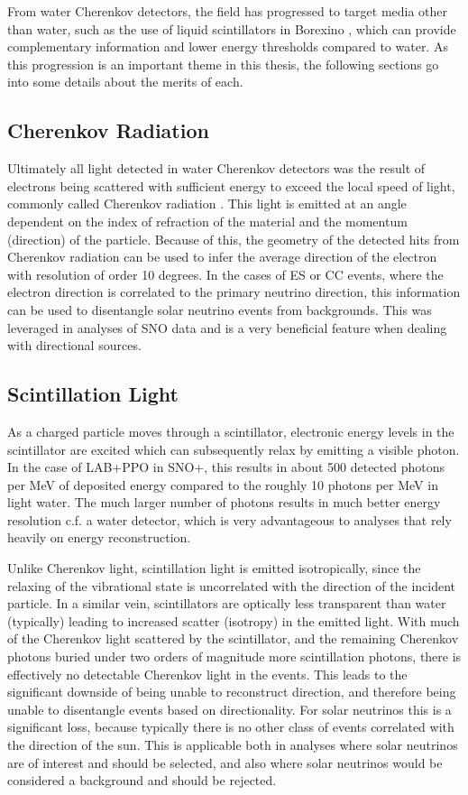 From water Cherenkov detectors, the field has progressed to target media other than water, such as the use of liquid scintillators in Borexino \cite{borexino}, which can provide complementary information and lower energy thresholds compared to water.
As this progression is an important theme in this thesis, the following sections go into some details about the merits of each.

\subsection{Cherenkov Radiation}

Ultimately all light detected in water Cherenkov detectors was the result of electrons being scattered with sufficient energy to exceed the local speed of light, commonly called Cherenkov radiation \cite{cherenkov}.
This light is emitted at an angle dependent on the index of refraction of the material and the momentum (direction) of the particle. 
Because of this, the geometry of the detected hits from Cherenkov radiation can be used to infer the average direction of the electron with resolution of order 10 degrees.
In the cases of ES or CC events, where the electron direction is correlated to the primary neutrino direction, this information can be used to disentangle solar neutrino events from backgrounds.
This was leveraged in analyses of SNO data and is a very beneficial feature when dealing with directional sources.

\subsection{Scintillation Light}

As a charged particle moves through a scintillator, electronic energy levels in the scintillator are excited which can subsequently relax by emitting a visible photon.
In the case of LAB+PPO in SNO+, this results in about 500 detected photons per MeV of deposited energy compared to the roughly 10 photons per MeV in light water.
The much larger number of photons results in much better energy resolution c.f. a water detector, which is very advantageous to analyses that rely heavily on energy reconstruction.

Unlike Cherenkov light, scintillation light is emitted isotropically, since the relaxing of the vibrational state is uncorrelated with the direction of the incident particle.
In a similar vein, scintillators are optically less transparent than water (typically) leading to increased scatter (isotropy) in the emitted light.
With much of the Cherenkov light scattered by the scintillator, and the remaining Cherenkov photons buried under two orders of magnitude more scintillation photons, there is effectively no detectable Cherenkov light in the events.
This leads to the significant downside of being unable to reconstruct direction, and therefore being unable to disentangle events based on directionality. 
For solar neutrinos this is a significant loss, because typically there is no other class of events correlated with the direction of the sun.
This is applicable both in analyses where solar neutrinos are of interest and should be selected, and also where solar neutrinos would be considered a background and should be rejected.

